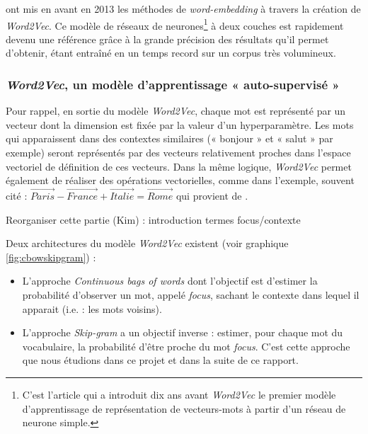\documentclass[11pt,french,french]{article}
\let\rmarkdownfootnote\footnote%
\def\footnote{\protect\rmarkdownfootnote}
\begin{document}
\cite{Mikolov} ont mis en avant en 2013 les méthodes de
\emph{word-embedding} à travers la création de \emph{Word2Vec}. Ce
modèle de réseaux de neurones\footnote{C'est l'article \cite{Bengio} qui
  a introduit dix ans avant \emph{Word2Vec} le premier modèle
  d'apprentissage de représentation de vecteurs-mots à partir d'un
  réseau de neurone simple.} à deux couches est rapidement devenu une
référence grâce à la grande précision des résultats qu'il permet
d'obtenir, étant entraîné en un temps record sur un corpus très
volumineux.

\subsubsection{\texorpdfstring{\emph{Word2Vec}, un modèle
d'apprentissage « auto-supervisé
»}{Word2Vec, un modèle d'apprentissage « auto-supervisé »}}\label{subsec:word2vec}

Pour rappel, en sortie du modèle \emph{Word2Vec}, chaque mot est
représenté par un vecteur dont la dimension est fixée par la valeur d'un
hyperparamètre. Les mots qui apparaissent dans des contextes similaires
(« bonjour » et « salut » par exemple) seront représentés par des
vecteurs relativement proches dans l'espace vectoriel de définition de
ces vecteurs. Dans la même logique, \emph{Word2Vec} permet également de
réaliser des opérations vectorielles, comme dans l'exemple, souvent cité
:
\(\overrightarrow{Paris} - \overrightarrow{France} + \overrightarrow{Italie} = \overrightarrow{Rome}\)
qui provient de \cite{Mikolov}.

\colorbox{BurntOrange}{Reorganiser cette partie (Kim) : introduction termes focus/contexte}

Deux architectures du modèle \emph{Word2Vec} existent (voir graphique
\ref{fig:cbowskipgram}) :

\begin{itemize}
\item
  L'approche \emph{Continuous bags of words} dont l'objectif est
  d'estimer la probabilité d'observer un mot, appelé \emph{focus},
  sachant le contexte dans lequel il apparait (i.e. : les mots voisins).
\item
  L'approche \emph{Skip-gram} a un objectif inverse : estimer, pour
  chaque mot du vocabulaire, la probabilité d'être proche du mot
  \emph{focus}. C'est cette approche que nous étudions dans ce projet et
  dans la suite de ce rapport.
\end{itemize}
\end{document}
